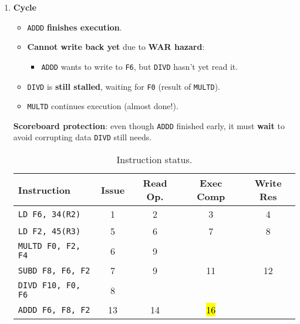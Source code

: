 \begin{enumerate}
    \newpage


    \item \textbf{Cycle \theenumi}
    \begin{itemize}
        \item[\textcolor{Green3}{\faIcon{check}}] \texttt{ADDD} \textbf{finishes execution}.
        \item[\textcolor{Red2}{\faIcon{times}}] \textbf{Cannot write back yet} due to \textbf{WAR hazard}:
        \begin{itemize}
            \item \texttt{ADDD} wants to write to \texttt{F6}, but \texttt{DIVD} hasn't yet read it.
        \end{itemize}
        \item \texttt{DIVD} is \textbf{still stalled}, waiting for \texttt{F0} (result of \texttt{MULTD}).
        \item \texttt{MULTD} continues execution (almost done!).
    \end{itemize}
    \textbf{Scoreboard protection}: even though \texttt{ADDD} finished early, it must \textbf{wait} to avoid corrupting data \texttt{DIVD} still needs.

    \begin{table}[!htp]
        \centering
        \begin{tabular}{@{} l | c c c c @{}}
            \toprule
            Instruction                 & Issue     & Read Op.  & Exec Comp & Write Res \\
            \midrule
            \texttt{LD    F6, 34(R2)}   & 1         & 2         & 3         & 4         \\ [.3em]
            \texttt{LD    F2, 45(R3)}   & 5         & 6         & 7         & 8         \\ [.3em]
            \texttt{MULTD F0, F2, F4}   & 6         & 9         &           &           \\ [.3em]
            \texttt{SUBD  F8, F6, F2}   & 7         & 9         & 11        & 12        \\ [.3em]
            \texttt{DIVD  F10, F0, F6}  & 8         &           &           &           \\ [.3em]
            \texttt{ADDD  F6, F8, F2}   & 13        & 14        & \hl{16}   &           \\
            \bottomrule
        \end{tabular}
        \caption*{Instruction status.}
    \end{table}


\end{enumerate}
